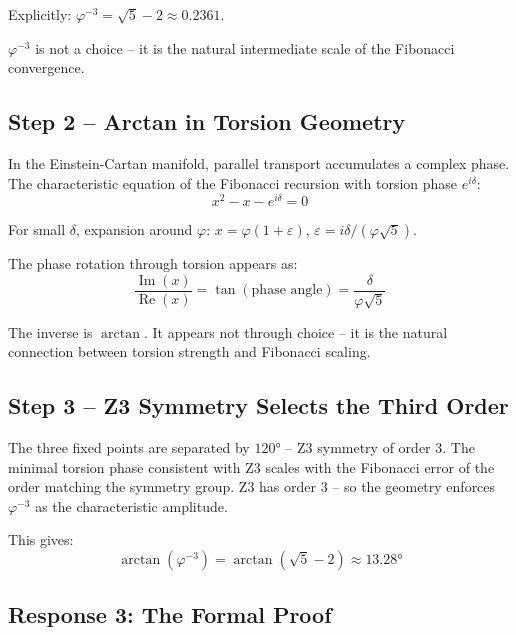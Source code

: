 Explicitly: $\varphi^{-3} = \sqrt{5} - 2 \approx 0.2361$.

$\varphi^{-3}$ is not a choice -- it is the natural intermediate scale of the Fibonacci convergence.

\subsection{Step 2 -- Arctan in Torsion Geometry}

In the Einstein-Cartan manifold, parallel transport accumulates a complex phase. The characteristic equation of the Fibonacci recursion with torsion phase $e^{i\delta}$:
\begin{equation}
  x^2 - x - e^{i\delta} = 0
\end{equation}

For small $\delta$, expansion around $\varphi$: $x = \varphi(1 + \varepsilon)$, $\varepsilon = i\delta/(\varphi\sqrt{5})$.

The phase rotation through torsion appears as:
\begin{equation}
  \frac{\operatorname{Im}(x)}{\operatorname{Re}(x)} = \tan(\text{phase angle}) = \frac{\delta}{\varphi\sqrt{5}}
\end{equation}

The inverse is $\arctan$. It appears not through choice -- it is the natural connection between torsion strength and Fibonacci scaling.

\subsection{Step 3 -- Z3 Symmetry Selects the Third Order}

The three fixed points are separated by $120°$ -- Z3 symmetry of order 3. The minimal torsion phase consistent with Z3 scales with the Fibonacci error of the order matching the symmetry group. Z3 has order 3 -- so the geometry enforces $\varphi^{-3}$ as the characteristic amplitude.

This gives:
\begin{equation}
  \boxed{\arctan(\varphi^{-3}) = \arctan(\sqrt{5} - 2) \approx 13.28°}
\end{equation}

\subsection{Response 3: The Formal Proof}

